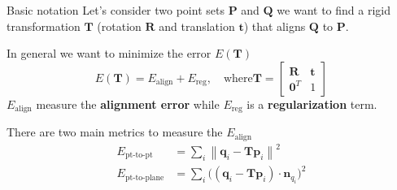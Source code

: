 \documentclass[aspectratio=1610]{beamer}
\newcommand{\norm}[1]{\left\lVert#1\right\rVert}
\newcommand{\Ealign}{\bm{q}_i-\bm{T}\bm{p}_i}
\begin{document}
\begin{frame}[allowframebreaks]{Basic notation}
Let's consider two point sets $\bm{P}$ and $\bm{Q}$ we want to find a rigid transformation $\bm{T}$ (rotation $\bm{R}$ and translation $\bm{t}$) that aligns $\bm{Q}$ to $\bm{P}$. 

In general we want to minimize the error $E(\bm{T})$ 
\[ 
E(\bm{T})=E_{\text{align}}+E_{\text{reg}}, \quad \text{where}
\bm{T} = \begin{bmatrix}
   \bm{R} & \bm{t} \\
   \bm{0}^{T} & 1   
\end{bmatrix} 
\]
$E_{\text{align}}$ measure the \textbf{alignment error} while $E_{\text{reg}}$ is a \textbf{regularization} term. 

\framebreak

There are two main metrics to measure the $E_{\text{align}}$
\begin{align}
E_\text{pt-to-pt} &= \sum_i{\norm{\Ealign}^2} \label{pt2pt} \\
E_\text{pt-to-plane} & = \sum_i{\big((\Ealign)\cdot\bm{n}_{q_i}\big)^2} \label{pt2pl}
\end{align}

\framebreak


\end{frame}
\end{document}
